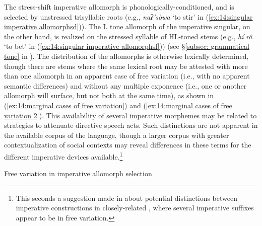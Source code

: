 The stress-shift imperative allomorph is phonologically-conditioned, and is selected by unstressed trisyllabic roots (e.g., \textit{naʔ'sòwa} `to stir' in (\ref{ex:14:singular imperative allomorphsd})). The L tone allomorph of the imperative singular, on the other hand, is realized on the stressed syllable of HL-toned stems (e.g., \textit{hiˈrâ} `to bet' in (\ref{ex:14:singular imperative allomorphsf})) (see §\ref{subsec: grammatical tone} in ). The distribution of the allomorphs is otherwise lexically determined, though there are stems where the same lexical root may be attested with more than one allomorph in an apparent case of free variation (i.e., with no apparent semantic differences) and without any multiple exponence (i.e., one or another allomorph will surface, but not both at the same time), as shown in (\ref{ex:14:marginal cases of free variation}) and (\ref{ex:14:marginal cases of free variation 2}). This availability of several imperative morphemes may be related to strategies to attenuate directive speech acts. Such distinctions are not apparent in the available corpus of the language, though a larger corpus with greater contextualization of social contexts may reveal differences in these terms for the different imperative devices available.\footnote{This seconds a suggestion made in \citep[][107]{miller1996guarijio} about potential distinctions between imperative constructions in closely-related , where several imperative suffixes appear to be in free variation.}

\largerpage

\ea\label{ex:14:marginal cases of free variation}
{Free variation in imperative allomorph selection}

    \z
\z

